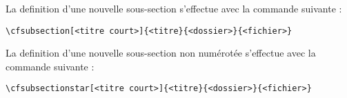 La definition d'une nouvelle sous-section s'effectue avec la commande suivante :
\begin{verbatim}
\cfsubsection[<titre court>]{<titre}{<dossier>}{<fichier>}
\end{verbatim}
La definition d'une nouvelle sous-section non num\'erot\'ee s'effectue avec la commande suivante :
\begin{verbatim}
\cfsubsectionstar[<titre court>]{<titre}{<dossier>}{<fichier>}
\end{verbatim}